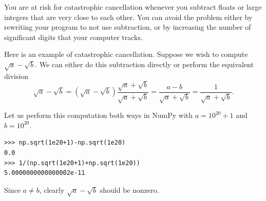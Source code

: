 You are at risk for catastrophic cancellation whenever you subtract floats or large integers that are very close to each other.
You can avoid the problem either by rewriting your program to not use subtraction, or by increasing the number of significant digits that your computer tracks.

Here is an example of catastrophic cancellation.
Suppose we wish to compute $\sqrt{a}-\sqrt{b}$. We can either do this subtraction directly or perform the equivalent division
\[
\sqrt{a}-\sqrt{b} = (\sqrt{a}-\sqrt{b})\frac{\sqrt{a}+\sqrt{b}}{\sqrt{a}+\sqrt{b}} = \frac{a-b}{\sqrt{a}+\sqrt{b}}=\frac{1}{\sqrt{a}+\sqrt{b}}.
\]

Let us perform this computation both ways in NumPy with $a=10^20+1$ and $b=10^20$.
\begin{lstlisting}
>>> np.sqrt(1e20+1)-np.sqrt(1e20)
0.0
>>> 1/(np.sqrt(1e20+1)+np.sqrt(1e20))
5.0000000000000002e-11
\end{lstlisting}
Since $a \neq b$, clearly $\sqrt{a}-\sqrt{b}$ should be nonzero. 


